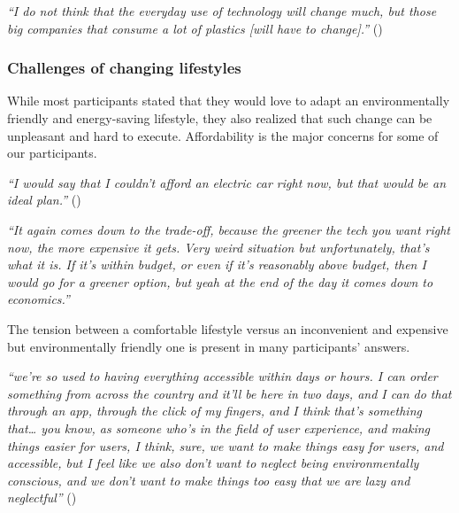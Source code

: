     \begin{quoting}
        \textit{``I do not think that the everyday use of technology will change much, but those big companies that consume a lot of plastics [will have to change].''} ()
    \end{quoting}
    
    \subsubsection{Challenges of changing lifestyles}
    
    While most participants stated that they would love to adapt an environmentally friendly and energy-saving lifestyle, they also realized that such change can be unpleasant and hard to execute. Affordability is the major concerns for some of our participants. %
    
    \begin{quoting}
        \textit{``I would say that I couldn't afford an electric car right now, but that would be an ideal plan.''} ()
    \end{quoting}
    
    \begin{quoting}
        \textit{``It again comes down to the trade-off, because the greener the tech you want right now, the more expensive it gets. Very weird situation but unfortunately, that's what it is. If it's within budget, or even if it's reasonably above budget, then I would go for a greener option, but yeah at the end of the day it comes down to economics.''}
    \end{quoting}
    
    The tension between a comfortable lifestyle versus an inconvenient and expensive but environmentally friendly one is present in many participants' answers. %
    
    \begin{quoting}
        \textit{``we're so used to having everything accessible within days or hours. I can order something from across the country and it'll be here in two days, and I can do that through an app, through the click of my fingers, and I think that's something that… you know, as someone who's in the field of user experience, and making things easier for users, I think, sure, we want to make things easy for users, and accessible, but I feel like we also don't want to neglect being environmentally conscious, and we don't want to make things too easy that we are lazy and neglectful''} ()
    \end{quoting}

